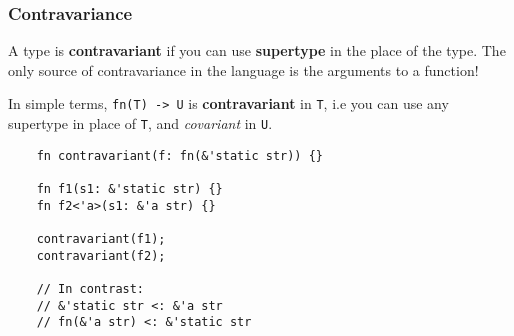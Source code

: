 \documentclass[aspectratio=1610,t]{beamer}
\begin{document}
\begin{frame}[fragile]
\frametitle{Contravariance}
A type is \textbf{contravariant} if you can use \textbf{supertype} in the place of the type. The only source of contravariance in the language is the arguments to a function!

In simple terms, \texttt{fn(T) -> U} is \textbf{contravariant} in \texttt{T}, i.e you can use any supertype in place of \texttt{T}, and \textit{covariant} in \texttt{U}.

\begin{verbatim}
    fn contravariant(f: fn(&'static str)) {}

    fn f1(s1: &'static str) {}
    fn f2<'a>(s1: &'a str) {}

    contravariant(f1);
    contravariant(f2);

    // In contrast:
    // &'static str <: &'a str
    // fn(&'a str) <: &'static str
\end{verbatim}
\end{frame}

\end{document}
